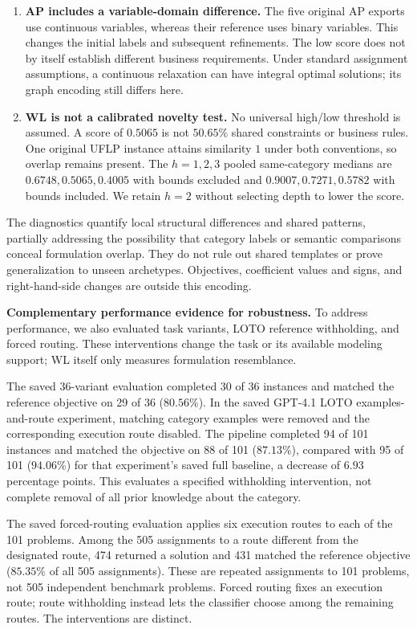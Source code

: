 \documentclass[11pt]{article}
\begin{document}
\begin{enumerate}[label=(AssoE.\arabic*),leftmargin=*]
\begin{enumerate}
\item \textbf{AP includes a variable-domain difference.}
The five original AP exports use continuous variables, whereas their
reference uses binary variables. This changes the initial labels
and subsequent refinements. The low score does not by itself
establish different business requirements.
Under standard assignment assumptions, a continuous relaxation can
have integral optimal solutions; its graph encoding still differs here.

\item \textbf{WL is not a calibrated novelty test.}
No universal high/low threshold is assumed.
A score of $0.5065$ is not $50.65\%$ shared constraints or business rules.
One original UFLP instance attains similarity $1$ under both
conventions, so overlap remains present.
The $h=1,2,3$ pooled same-category medians are
$0.6748,0.5065,0.4005$ with bounds excluded and
$0.9007,0.7271,0.5782$ with bounds included.
We retain $h=2$ without selecting depth to lower the score.
\end{enumerate}

The diagnostics quantify local structural differences and shared
patterns, partially addressing the possibility that category labels
or semantic comparisons conceal formulation overlap.
They do not rule out shared templates or prove generalization to
unseen archetypes. Objectives, coefficient values and signs, and
right-hand-side changes are outside this encoding.

\medskip
\textbf{Complementary performance evidence for robustness.}
To address performance, we also evaluated task variants, LOTO
reference withholding, and forced routing.
These interventions change the task or its available modeling
support; WL itself only measures formulation resemblance.

The saved 36-variant evaluation completed 30 of 36 instances and
matched the reference objective on 29 of 36 ($80.56\%$).
In the saved GPT-4.1 LOTO examples-and-route experiment,
matching category examples were removed and the corresponding
execution route disabled. The pipeline completed 94 of 101
instances and matched the objective on 88 of 101 ($87.13\%$),
compared with 95 of 101 ($94.06\%$) for that experiment's saved
full baseline, a decrease of $6.93$ percentage points.
This evaluates a specified withholding intervention, not complete
removal of all prior knowledge about the category.

The saved forced-routing evaluation applies six execution routes
to each of the 101 problems.
Among the 505 assignments to a route different from the designated
route, 474 returned a solution and 431 matched the reference
objective ($85.35\%$ of all 505 assignments).
These are repeated assignments to 101 problems, not 505 independent
benchmark problems. Forced routing fixes an execution route;
route withholding instead lets the classifier choose among the
remaining routes. The interventions are distinct.


\end{enumerate}
\end{document}

